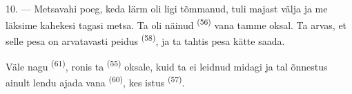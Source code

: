 10. --- Metsavahi poeg, keda  lärm oli ligi tõmmanud, tuli majast välja
ja me läksime kahekesi tagasi metsa. Ta oli näinud 
\textsuperscript{(56)} vana tamme oksal. Ta arvas, et selle pesa on arvatavasti peidus
 \textsuperscript{(58)}, ja ta tahtis pesa kätte saada.

Väle nagu  \textsuperscript{(61)}, ronis ta 
\textsuperscript{(55)} oksale, kuid ta ei leidnud midagi ja tal õnnestus ainult lendu
ajada vana  \textsuperscript{(60)}, kes istus 
\textsuperscript{(57)}.

\VUsaut{4.0mm}
\VUfilet{22mm}
